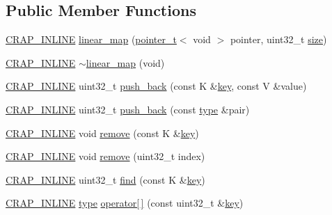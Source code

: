 \subsection*{Public Member Functions}
\begin{DoxyCompactItemize}
\item 
\hyperlink{config__x86_8h_a5a40526b8d842e7ff731509998bb0f1c}{C\+R\+A\+P\+\_\+\+I\+N\+L\+I\+N\+E} \hyperlink{classcrap_1_1linear__map_a8326fafe5af8c531c329b038551dd03e}{linear\+\_\+map} (\hyperlink{structcrap_1_1pointer__t}{pointer\+\_\+t}$<$ void $>$ pointer, uint32\+\_\+t \hyperlink{classcrap_1_1linear__map_ab2b37254485aa0632b669d02e5191133}{size})
\item 
\hyperlink{config__x86_8h_a5a40526b8d842e7ff731509998bb0f1c}{C\+R\+A\+P\+\_\+\+I\+N\+L\+I\+N\+E} \hyperlink{classcrap_1_1linear__map_ae94f35f560f6a5c20000f1ebce19fc47}{$\sim$linear\+\_\+map} (void)
\item 
\hyperlink{config__x86_8h_a5a40526b8d842e7ff731509998bb0f1c}{C\+R\+A\+P\+\_\+\+I\+N\+L\+I\+N\+E} uint32\+\_\+t \hyperlink{classcrap_1_1linear__map_af829e7e5d2a60011b49d7d1c5add00b4}{push\+\_\+back} (const K \&\hyperlink{classcrap_1_1linear__map_a710c4784756c34edffaba22d614a0af0}{key}, const V \&value)
\item 
\hyperlink{config__x86_8h_a5a40526b8d842e7ff731509998bb0f1c}{C\+R\+A\+P\+\_\+\+I\+N\+L\+I\+N\+E} uint32\+\_\+t \hyperlink{classcrap_1_1linear__map_ab2c81bf91c71c02ca7ed9137516ff90c}{push\+\_\+back} (const \hyperlink{classcrap_1_1linear__map_ad8544be54068ac03936e6696c076bf9a}{type} \&pair)
\item 
\hyperlink{config__x86_8h_a5a40526b8d842e7ff731509998bb0f1c}{C\+R\+A\+P\+\_\+\+I\+N\+L\+I\+N\+E} void \hyperlink{classcrap_1_1linear__map_af4d851117280669c5fd76d864c650a33}{remove} (const K \&\hyperlink{classcrap_1_1linear__map_a710c4784756c34edffaba22d614a0af0}{key})
\item 
\hyperlink{config__x86_8h_a5a40526b8d842e7ff731509998bb0f1c}{C\+R\+A\+P\+\_\+\+I\+N\+L\+I\+N\+E} void \hyperlink{classcrap_1_1linear__map_a071de7b95feb1dd86bd4835efc71d292}{remove} (uint32\+\_\+t index)
\item 
\hyperlink{config__x86_8h_a5a40526b8d842e7ff731509998bb0f1c}{C\+R\+A\+P\+\_\+\+I\+N\+L\+I\+N\+E} uint32\+\_\+t \hyperlink{classcrap_1_1linear__map_a76e45ca918556e4d25e4f5a2212485e4}{find} (const K \&\hyperlink{classcrap_1_1linear__map_a710c4784756c34edffaba22d614a0af0}{key})
\item 
\hyperlink{config__x86_8h_a5a40526b8d842e7ff731509998bb0f1c}{C\+R\+A\+P\+\_\+\+I\+N\+L\+I\+N\+E} \hyperlink{classcrap_1_1linear__map_ad8544be54068ac03936e6696c076bf9a}{type} \hyperlink{classcrap_1_1linear__map_aa836c5c319dc247166560df69902e305}{operator\mbox{[}$\,$\mbox{]}} (const uint32\+\_\+t \&\hyperlink{classcrap_1_1linear__map_a710c4784756c34edffaba22d614a0af0}{key})

\end{DoxyCompactItemize}
